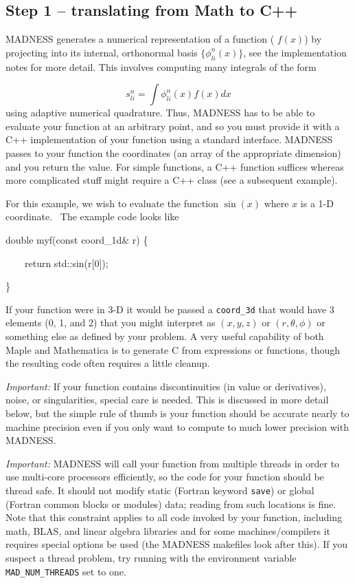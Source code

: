 \documentclass[letterpaper]{article}
\begin{document}
\subsection{Step 1 -- translating from Math to C++}
MADNESS generates a numerical representation of a function ( $f(x)$) by projecting into its internal, orthonormal basis 
$\{\phi _{li}^{n}(x)\}$, see the implementation notes for more detail. This involves computing many integrals of the
form 

\begin{equation}
s_{li}^{n}=\int \phi _{li}^{n}(x)f(x)\mathit{dx}
\end{equation}
using adaptive numerical quadrature. Thus, MADNESS has to be able to evaluate your function at an arbitrary point, and
so you must provide it with a C++ implementation of your function using a standard interface. MADNESS passes to your
function the coordinates (an array of the appropriate dimension) and you return the value. For simple functions, a C++
function suffices whereas more complicated stuff might require a C++ class (see a subsequent example).

For this example, we wish to evaluate the function  $\sin (x)$ where  $x$ is a 1-D coordinate. \ The example code looks
like

{\ttfamily
double myf(const coord\_1d\& r) \{}

{\ttfamily
\ \ \ \ return std::sin(r[0]);}

{\ttfamily
\}}

If your function were in 3-D it would be passed a \texttt{coord\_3d} that would have 3 elements (0, 1, and 2) that you
might interpret as  $(x,y,z)$ or  $(r,\theta ,\phi )$ or something else as defined by your problem. A very useful
capability of both Maple and Mathematica is to generate C from expressions or functions, though the resulting code
often requires a little cleanup. 

\textit{Important:}\textit{ }If your function contains discontinuities (in value or derivatives), noise, or
singularities, special care is needed. This is discussed in more detail below, but the simple rule of thumb is your
function should be accurate nearly to machine precision even if you only want to compute to much lower precision with
MADNESS.

\textit{Important:} MADNESS will call your function from multiple threads in order to use multi-core processors
efficiently, so the code for your function should be thread safe. It should not modify static (Fortran keyword
\texttt{save}) or global (Fortran common blocks or modules) data; reading from such locations is fine. Note that this
constraint applies to all code invoked by your function, including math, BLAS, and linear algebra libraries and for
some machines/compilers it requires special options be used (the MADNESS makefiles look after this). If you suspect a
thread problem, try running with the environment variable \texttt{MAD\_NUM\_THREADS} set to one.
\end{document}
